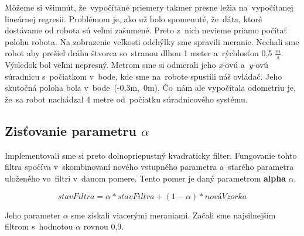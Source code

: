 Môžeme si všimnúť, že~vypočítané priemery takmer presne ležia na~vypočítanej lineárnej regresii. Problémom je, ako už bolo spomenuté, že~dáta,
ktoré dostávame od robota sú veľmi zašumené. Preto z~nich nevieme priamo počítať polohu robota. Na zobrazenie veľkosti odchýlky sme spravili
meranie. Nechali sme robot aby prešiel dráhu štvorca so~stranou dlhou 1 meter a~rýchlosťou 0,5 \(\frac{m}{s}\). Výsledok bol veľmi nepresný.
Metrom sme si odmerali jeho \textit{x}-ovú a~\textit{y}-ovú súradnicu s~počiatkom v~bode, kde sme na~robote spustili náš ovládač. Jeho skutočná
poloha bola v~bode~(-0,3m,~0m). Čo~nám ale vypočítala odometriu je, že~sa robot nachádzal 4 metre od~počiatku súradnicového systému.

\subsection{Zisťovanie parametru \(\alpha\)}

Implementovali sme si preto dolnopriepustný kvadraticky filter. Fungovanie tohto filtra spočíva v~skombinovaní nového vstupného parametra a~starého parametra
uloženého vo~filtri v~danom pomere. Tento pomer je daný parametrom \textbf{alpha} $\alpha$.

$$ stavFiltra = \alpha * stavFiltra + (1 - \alpha) * nováVzorka $$

Jeho parameter \(\alpha\) sme získali viacerými meraniami. Začali sme najsilnejším filtrom s~hodnotou $\alpha$ rovnou  0,9.

